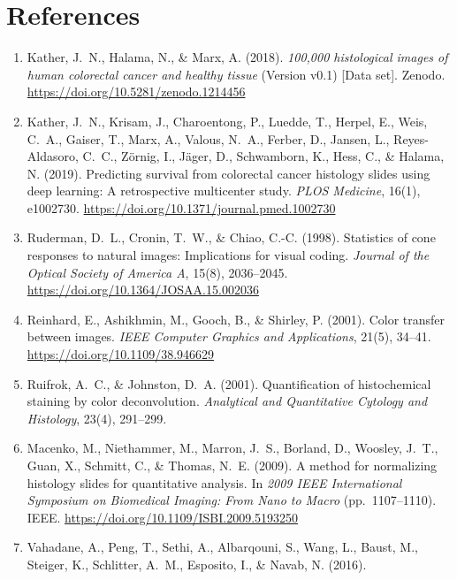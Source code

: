 \documentclass[11pt,a4paper]{article}
\begin{document}
\section{References}
\begin{enumerate}[label=\arabic*.,leftmargin=*]
  \item Kather, J.~N., Halama, N., \& Marx, A. (2018). \textit{100,000 histological
        images of human colorectal cancer and healthy tissue} (Version v0.1)
        [Data set]. Zenodo. \url{https://doi.org/10.5281/zenodo.1214456}
  \item Kather, J.~N., Krisam, J., Charoentong, P., Luedde, T., Herpel, E., Weis,
        C.~A., Gaiser, T., Marx, A., Valous, N.~A., Ferber, D., Jansen, L.,
        Reyes-Aldasoro, C.~C., Z\"ornig, I., J\"ager, D., Schwamborn, K., Hess, C.,
        \& Halama, N. (2019). Predicting survival from colorectal cancer histology
        slides using deep learning: A retrospective multicenter study.
        \textit{PLOS Medicine}, 16(1), e1002730.
        \url{https://doi.org/10.1371/journal.pmed.1002730}
  \item Ruderman, D.~L., Cronin, T.~W., \& Chiao, C.-C. (1998). Statistics of cone
        responses to natural images: Implications for visual coding.
        \textit{Journal of the Optical Society of America A}, 15(8), 2036--2045.
        \url{https://doi.org/10.1364/JOSAA.15.002036}
  \item Reinhard, E., Ashikhmin, M., Gooch, B., \& Shirley, P. (2001). Color transfer
        between images. \textit{IEEE Computer Graphics and Applications}, 21(5),
        34--41. \url{https://doi.org/10.1109/38.946629}
  \item Ruifrok, A.~C., \& Johnston, D.~A. (2001). Quantification of histochemical
        staining by color deconvolution. \textit{Analytical and Quantitative Cytology
        and Histology}, 23(4), 291--299.
  \item Macenko, M., Niethammer, M., Marron, J.~S., Borland, D., Woosley, J.~T.,
        Guan, X., Schmitt, C., \& Thomas, N.~E. (2009). A method for normalizing
        histology slides for quantitative analysis. In \textit{2009 IEEE International
        Symposium on Biomedical Imaging: From Nano to Macro} (pp.~1107--1110). IEEE.
        \url{https://doi.org/10.1109/ISBI.2009.5193250}
  \item Vahadane, A., Peng, T., Sethi, A., Albarqouni, S., Wang, L., Baust, M.,
        Steiger, K., Schlitter, A.~M., Esposito, I., \& Navab, N. (2016).

\end{enumerate}
\end{document}
